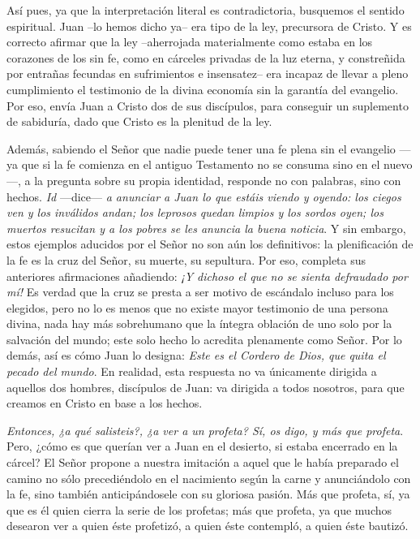 \begin{body}
\begin{body}
Así pues, ya que la interpretación literal es contradictoria, busquemos el sentido espiritual. Juan --lo hemos dicho ya-- era tipo de la ley, precursora de Cristo. Y es correcto afirmar que la ley --aherrojada materialmente como estaba en los corazones de los sin fe, como en cárceles privadas de la luz eterna, y constreñida por entrañas fecundas en sufrimientos e insensatez-- era incapaz de llevar a pleno cumplimiento el testimonio de la divina economía sin la garantía del evangelio. Por eso, envía Juan a Cristo dos de sus discípulos, para conseguir un suplemento de sabiduría, dado que Cristo es la plenitud de la ley.

Además, sabiendo el Señor que nadie puede tener una fe plena sin el evangelio ---ya que si la fe comienza en el antiguo Testamento no se consuma sino en el nuevo---, a la pregunta sobre su propia identidad, responde no con palabras, sino con hechos. \emph{Id} ---dice--- \emph{a anunciar a Juan lo que estáis viendo y oyendo: los ciegos ven y los inválidos andan; los leprosos quedan limpios y los sordos oyen; los muertos resucitan y a los pobres se les anuncia la buena noticia}. Y sin embargo, estos ejemplos aducidos por el Señor no son aún los definitivos: la plenificación de la fe es la cruz del Señor, su muerte, su sepultura. Por eso, completa sus anteriores afirmaciones añadiendo: \emph{¡Y dichoso el que no se sienta defraudado por mí!} Es verdad que la cruz se presta a ser motivo de escándalo incluso para los elegidos, pero no lo es menos que no existe mayor testimonio de una persona divina, nada hay más sobrehumano que la íntegra oblación de uno solo por la salvación del mundo; este solo hecho lo acredita plenamente como Señor. Por lo demás, así es cómo Juan lo designa: \emph{Este es el Cordero de Dios, que quita el pecado del mundo}. En realidad, esta respuesta no va únicamente dirigida a aquellos dos hombres, discípulos de Juan: va dirigida a todos nosotros, para que creamos en Cristo en base a los hechos.

\emph{Entonces, ¿a qué salisteis?, ¿a ver a un profeta? Sí, os digo, y más que profeta}. Pero, ¿cómo es que querían ver a Juan en el desierto, si estaba encerrado en la cárcel? El Señor propone a nuestra imitación a aquel que le había preparado el camino no sólo precediéndolo en el nacimiento según la carne y anunciándolo con la fe, sino también anticipándosele con su gloriosa pasión. Más que profeta, sí, ya que es él quien cierra la serie de los profetas; más que profeta, ya que muchos desearon ver a quien éste profetizó, a quien éste contempló, a quien éste bautizó.


\end{body}
\end{body}
